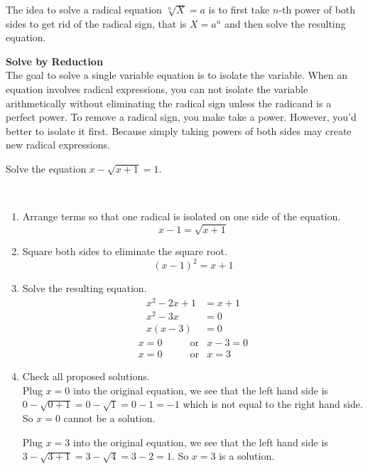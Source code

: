 \documentclass[
  en,11pt]{elegantbook}
\newcommand{\size}[2]{{\fontsize{#1}{0}\selectfont#2}}
\newenvironment{rmdtip}{
	\vspace*{0.5\baselineskip}
	\par\noindent
	\makebox[-3pt][r]{\color{red!90}\size{12}{\HandRight}\,\,}
    \begin{tcolorbox}[
    enhanced,
    title={\textbf{\color{second}Tips}},
    title style={left color=blue!10!green!20!white,right color=yellow!20!blue!20!white},
    colback=cyan!10!white,
    ]
    \sffamily
}{
    \end{tcolorbox}
    \par\ignorespacesafterend
}
\let\BeginKnitrBlock\begin \let\EndKnitrBlock\end
\begin{document}
The idea to solve a radical equation \(\sqrt[n]{X}=a\) is to first take \(n\)-th power of both sides to get rid of the radical sign, that is \(X=a^n\) and then solve the resulting equation.

\begin{rmdtip}

\textbf{Solve by Reduction}\\
The goal to solve a single variable equation is to isolate the variable. When an equation involves radical expressions, you can not isolate the variable arithmetically without eliminating the radical sign unless the radicand is a perfect power. To remove a radical sign, you make take a power. However, you'd better to isolate it first. Because simply taking powers of both sides may create new radical expressions.

\end{rmdtip}

\BeginKnitrBlock{example}
\protect\hypertarget{exm:unnamed-chunk-156}{}{\label{exm:unnamed-chunk-156} }
Solve the equation \(x-\sqrt{x+1}=1.\)
\EndKnitrBlock{example}

\BeginKnitrBlock{solution}
{}\\

\begin{enumerate}
\def\labelenumi{\arabic{enumi}.}
\item
  Arrange terms so that one radical is isolated on one side of the equation.
  \[x-1=\sqrt{x+1}\]
\item
  Square both sides to eliminate the square root.
  \[(x-1)^2=x+1\]
\item
  Solve the resulting equation.
  \[
     \begin{aligned}
         x^2-2x+1&=x+1\\
         x^2-3x&=0\\
         x(x-3)&=0
     \end{aligned}
  \]
  \[
  \begin{aligned}
     x =0 & \qquad \text{or} & x-3 =0 \\
     x =0 & \qquad \text{or} & x   =3
  \end{aligned}
  \]
\item
  Check all proposed solutions.\\
  Plug \(x=0\) into the original equation, we see that the left hand side is \(0-\sqrt{0+1}=0-\sqrt{1}=0-1=-1\) which is not equal to the right hand side. So \(x=0\) cannot be a solution.

  Plug \(x=3\) into the original equation, we see that the left hand side is \(3-\sqrt{3+1}=3-\sqrt{4}=3-2=1\). So \(x=3\) is a solution.
\end{enumerate}
\EndKnitrBlock{solution}
\end{document}
